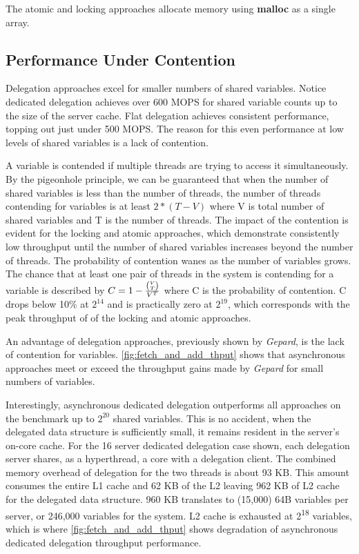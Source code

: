 \documentclass{uicthesi}
\begin{document}
The atomic and locking approaches allocate memory using \textbf{malloc} as a single array. 

\subsection{Performance Under Contention}

Delegation approaches excel for smaller numbers of shared variables. Notice dedicated delegation achieves over 600 MOPS for shared variable counts up to the size of the server cache. Flat delegation achieves consistent performance, topping out just under 500 MOPS. The reason for this even performance at low levels of shared variables is a lack of contention.

A variable is contended if multiple threads are trying to access it simultaneously. By the pigeonhole principle, we can be guaranteed that when the number of shared variables is less than the number of threads, the number of threads contending for variables is at least $ 2 * (T - V) $ where  V is total number of shared variables and T is the number of threads. The impact of the contention is evident for the locking and atomic approaches, which demonstrate consistently low throughput until the number of shared variables increases beyond the number of threads. The probability of contention wanes as the number of variables grows. The chance that at least one pair of threads in the system is contending for a variable is described by $C = 1 - {{ V \choose T }  \over  V^{T}}$ where C is the probability of contention. C drops below 10\% at $2^{14}$ and is practically zero at $2^{19}$, which corresponds with the peak throughput of of the locking and atomic approaches. 
 
An advantage of delegation approaches, previously shown by \textit{Gepard}, is the lack of contention for variables. \ref{fig:fetch_and_add_thput} shows that asynchronous approaches meet or exceed the throughput gains made by \textit{Gepard} for small numbers of variables. 

Interestingly, asynchronous dedicated delegation outperforms all approaches on the benchmark up to $2^{20}$ shared variables. This is no accident, when the delegated data structure is sufficiently small, it remains resident in the server's on-core cache. For the 16 server dedicated delegation case shown, each delegation server shares, as a hyperthread, a core with a delegation client. The combined memory overhead of delegation for the two threads is about 93 KB. This amount consumes the entire L1 cache and 62 KB of the L2 leaving 962 KB of L2 cache for the delegated data structure. 960 KB translates to (15,000) 64B variables per server, or 246,000 variables for the system. L2 cache is exhausted at 2\textsuperscript{18} variables, which is where \ref{fig:fetch_and_add_thput} shows degradation of asynchronous dedicated delegation throughput performance. 
\end{document}
